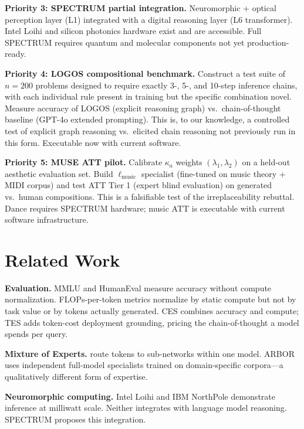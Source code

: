 \documentclass[12pt]{article}
\begin{document}
\textbf{Priority 3: SPECTRUM partial integration.} Neuromorphic + optical perception layer (L1) integrated with a digital reasoning layer (L6 transformer). Intel Loihi and silicon photonics hardware exist and are accessible. Full SPECTRUM requires quantum and molecular components not yet production-ready.

\textbf{Priority 4: LOGOS compositional benchmark.} Construct a test suite of $n=200$ problems designed to require exactly 3-, 5-, and 10-step inference chains, with each individual rule present in training but the specific combination novel. Measure accuracy of LOGOS (explicit reasoning graph) vs.\ chain-of-thought baseline (GPT-4o extended prompting). This is, to our knowledge, a controlled test of explicit graph reasoning vs.\ elicited chain reasoning not previously run in this form. Executable now with current software.

\textbf{Priority 5: MUSE ATT pilot.} Calibrate $\kappa_a$ weights $(\lambda_1, \lambda_2)$ on a held-out aesthetic evaluation set. Build $\ell_{\text{music}}$ specialist (fine-tuned on music theory + MIDI corpus) and test ATT Tier 1 (expert blind evaluation) on generated vs.\ human compositions. This is a falsifiable test of the irreplaceability rebuttal. Dance requires SPECTRUM hardware; music ATT is executable with current software infrastructure.

\section{Related Work}
\label{sec:related}

\textbf{Evaluation.} MMLU \cite{hendrycks2021} and HumanEval \cite{chen2021} measure accuracy without compute normalization. FLOPs-per-token metrics \cite{kaplan2020} normalize by static compute but not by task value or by tokens actually generated. CES combines accuracy and compute; TES adds token-cost deployment grounding, pricing the chain-of-thought a model spends per query.

\textbf{Mixture of Experts.} \cite{shazeer2017, jiang2024} route tokens to sub-networks within one model. ARBOR uses independent full-model specialists trained on domain-specific corpora---a qualitatively different form of expertise.

\textbf{Neuromorphic computing.} Intel Loihi \cite{davies2021} and IBM NorthPole \cite{ibm2023} demonstrate inference at milliwatt scale. Neither integrates with language model reasoning. SPECTRUM proposes this integration.
\end{document}
